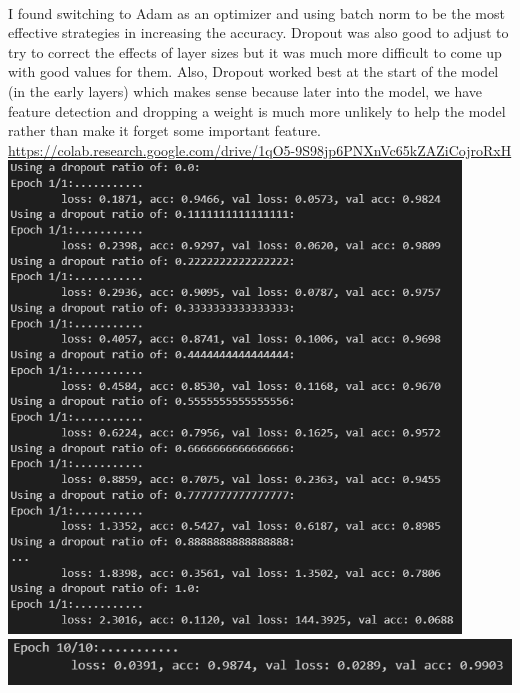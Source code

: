 \begin{solution}
  \\
  I found switching to Adam as an optimizer and using batch norm to be the most effective strategies in increasing the accuracy. Dropout was also good to adjust to try to correct the effects of layer sizes but it was much more difficult to come up with good values for them. Also, Dropout worked best at the start of the model (in the early layers) which makes sense because later into the model, we have feature detection and dropping a weight is much more unlikely to help the model rather than make it forget some important feature.
  \\
  \url{https://colab.research.google.com/drive/1qO5-9S98jp6PNXnVc65kZAZiCojroRxH}
  \\ \includegraphics[width=12cm]{images/P4_F.png}
  \\ \includegraphics{images/P4_F_fin_val.png}

\end{solution}

